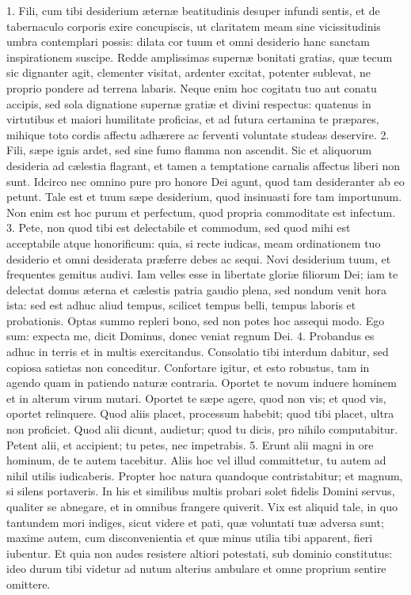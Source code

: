 \documentclass[twoside]{article}
\begin{document}
1. Fili, cum tibi desiderium æternæ beatitudinis desuper infundi sentis, et de tabernaculo corporis exire concupiscis, ut claritatem meam sine vicissitudinis umbra contemplari possis: dilata cor tuum et omni desiderio hanc sanctam inspirationem suscipe. Redde amplissimas supernæ bonitati gratias, quæ tecum sic dignanter agit, clementer visitat, ardenter excitat, potenter sublevat, ne proprio pondere ad terrena labaris. Neque enim hoc cogitatu tuo aut conatu accipis, sed sola dignatione supernæ gratiæ et divini respectus: quatenus in virtutibus et maiori humilitate proficias, et ad futura certamina te præpares, mihique toto cordis affectu adhærere ac ferventi voluntate studeas deservire.
2. Fili, sæpe ignis ardet, sed sine fumo flamma non ascendit. Sic et aliquorum desideria ad cælestia flagrant, et tamen a temptatione carnalis affectus liberi non sunt. Idcirco nec omnino pure pro honore Dei agunt, quod tam desideranter ab eo petunt. Tale est et tuum sæpe desiderium, quod insinuasti fore tam importunum. Non enim est hoc purum et perfectum, quod propria commoditate est infectum.
3. Pete, non quod tibi est delectabile et commodum, sed quod mihi est acceptabile atque honorificum: quia, si recte iudicas, meam ordinationem tuo desiderio et omni desiderata præferre debes ac sequi. Novi desiderium tuum, et frequentes gemitus audivi. Iam velles esse in libertate gloriæ filiorum Dei; iam te delectat domus æterna et cælestis patria gaudio plena, sed nondum venit hora ista: sed est adhuc aliud tempus, scilicet tempus belli, tempus laboris et probationis. Optas summo repleri bono, sed non potes hoc assequi modo. Ego sum: expecta me, dicit Dominus, donec veniat regnum Dei.
4. Probandus es adhuc in terris et in multis exercitandus. Consolatio tibi interdum dabitur, sed copiosa satietas non conceditur. Confortare igitur, et esto robustus, tam in agendo quam in patiendo naturæ contraria. Oportet te novum induere hominem et in alterum virum mutari. Oportet te sæpe agere, quod non vis; et quod vis, oportet relinquere. Quod aliis placet, processum habebit; quod tibi placet, ultra non proficiet. Quod alii dicunt, audietur; quod tu dicis, pro nihilo computabitur. Petent alii, et accipient; tu petes, nec impetrabis.
5. Erunt alii magni in ore hominum, de te autem tacebitur. Aliis hoc vel illud committetur, tu autem ad nihil utilis iudicaberis. Propter hoc natura quandoque contristabitur; et magnum, si silens portaveris. In his et similibus multis probari solet fidelis Domini servus, qualiter se abnegare, et in omnibus frangere quiverit. Vix est aliquid tale, in quo tantundem mori indiges, sicut videre et pati, quæ voluntati tuæ adversa sunt; maxime autem, cum disconvenientia et quæ minus utilia tibi apparent, fieri iubentur. Et quia non audes resistere altiori potestati, sub dominio constitutus: ideo durum tibi videtur ad nutum alterius ambulare et omne proprium sentire omittere.
\end{document}

